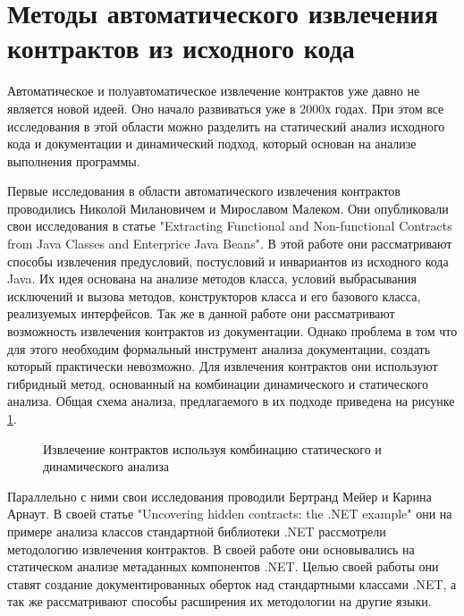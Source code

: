 \section{Методы автоматического извлечения контрактов из исходного кода}
Автоматическое и полуавтоматическое извлечение контрактов уже давно не является новой идеей. Оно начало развиваться уже в 2000х годах. При этом все исследования в этой области можно разделить на 
статический анализ исходного кода и документации и динамический подход, который основан на анализе выполнения программы.

Первые исследования в области автоматического извлечения контрактов проводились Николой Милановичем и Мирославом Малеком. Они опубликовали свои исследования в статье "Extracting Functional and Non-functional Contracts from Java Classes and Enterprice Java Beans"\cite{extractingContractsFromJava}. В этой работе они рассматривают способы извлечения предусловий, постусловий и инвариантов из исходного кода Java. Их идея основана на анализе методов класса, условий выбрасывания исключений и вызова методов, конструкторов класса и его базового класса, реализуемых интерфейсов. Так же в данной работе они рассматривают возможность извлечения контрактов из документации. Однако проблема в том что для этого необходим формальный инструмент анализа документации, создать который практически невозможно. Для извлечения контрактов они используют гибридный метод, основанный на комбинации динамического и статического анализа. Общая схема анализа, предлагаемого в их подходе приведена на рисунке \ref{image:milanovicExample}.
\begin{figure}[h!]
\caption{Извлечение контрактов используя комбинацию статического и динамического анализа}
\label{image:milanovicExample}
\end{figure}

Параллельно с ними свои исследования проводили Бертранд Мейер и Карина Арнаут. В своей статье "Uncovering hidden contracts: the .NET example" они на примере анализа классов стандартной библиотеки .NET рассмотрели методологию извлечения контрактов\cite{uncoveringHiddenContracts}. В своей работе они основывались на статическом анализе метаданных компонентов .NET. Целью своей работы они ставят создание документированных оберток над стандартными классами .NET, а так же рассматривают способы расширения их методологии на другие языки. 

